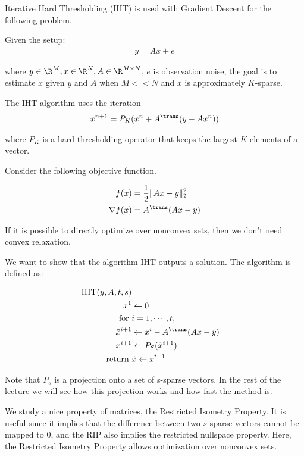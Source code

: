 Iterative Hard Thresholding (IHT) is used with Gradient Descent for the following problem.


Given the setup:
\begin{align}
y = A x + e 
\end{align}

where $y \in \R^M, x \in \R^N, A \in \R^{M \times N}$, $e$ is observation noise, the goal is to estimate $x$ given $y$ and $A$ when $M <<N$ and $x$ is approximately $K$-sparse.

The IHT algorithm uses the iteration
\begin{align}
x^{n+1} = P_K ( x^n + A^{\trans} (y - A x^n))
\end{align}

where $P_K$ is a hard thresholding operator that keeps the largest $K$ elements of a vector.

Consider the following objective function.

\begin{align}
f(x) &= \frac{1}{2} \| Ax - y \|_2^2 \\
\nabla f(x) &= A^{\trans}(Ax - y)
\end{align}

If it is possible to directly optimize over nonconvex sets, then we don't need convex relaxation.

We want to show that the algorithm IHT outputs a solution. The algorithm is defined as:

\begin{align*}
\text{IHT}(y, A, t, s) \\
x^1 &\leftarrow 0 \\
\text{ for } &i=1 ,\cdots, t, \\
\tilde{x}^{i+1} &\leftarrow x^i - A^{\trans} (Ax - y) \\
x^{i+1} &\leftarrow P_S( \tilde{x}^{i+1} ) \\
\text{ return }& \hat{x} \leftarrow x^{t+1}
\end{align*}

Note that $P_s$ is a projection onto a set of s-sparse vectors. In the rest of the lecture we will see how this projection works and how fast the method is.


We study a nice property of matrices, the Restricted Isometry Property. It is useful since it implies that the difference between two $s$-sparse vectors cannot be mapped to 0, and the RIP also implies the restricted nullspace property.
Here, the Restricted Isometry Property allows optimization over nonconvex sets.

